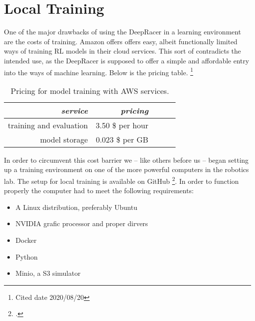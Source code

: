  \section{Local Training}
 
 One of the major drawbacks of using the DeepRacer in a learning environment are the costs of training. Amazon offers offers easy, albeit functionally limited ways of training RL models in their cloud services. This sort of contradicts the intended use, as the DeepRacer is supposed to offer a simple and affordable entry into the ways of machine learning. Below is the pricing table. \footnote{Cited date 2020/08/20}
 \begin{table}
 \caption{Pricing for model training with AWS services.}
 \label{tab:services}
 \centering
 \setlength{\tabcolsep}{5mm}
 \def\arraystretch{1.25}
 \begin{tabular}{|r|r|c|c|c|}
 \emph{service} & \emph{pricing} \\
 \hline\hline
 training and evaluation & 3.50 \$ per hour \\
 \hline
 model storage & 0.023 \$ per GB \\
 \hline
 \end{tabular}
 \end{table}
 In order to circumvent this cost barrier we -- like others before us -- began setting up a training environment on one of the more powerful computers in the robotics lab.
 The setup for local training is available on GitHub \footcite{https://github.com/aws-deepracer-community/deepracer}. In order to function properly the computer had to meet the following requirements:
 \begin{itemize}
 \item A Linux distribution, preferably Ubuntu
 \item NVIDIA grafic processor and proper dirvers
 \item Docker
 \item Python
 \item Minio, a S3 simulator
 \end{itemize}